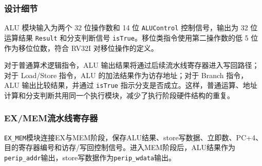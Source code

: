 \documentclass[12pt,a4paper]{ctexart}
\newcommand{\code}[1]{\texttt{#1}}
\begin{document}
\subsubsection*{设计细节}

ALU 模块输入为两个 32 位操作数和 14 位 \code{ALUControl} 控制信号，输出为 32 位运算结果 \code{Result} 和分支判断信号 \code{isTrue}。移位类指令使用第二操作数的低 5 位作为移位位数，符合 RV32I 对移位操作的定义。

对于普通算术逻辑指令，ALU 输出结果将通过后续流水线寄存器进入写回路径；对于 Load/Store 指令，ALU 的加法结果作为访存地址；对于 Branch 指令，ALU 输出比较结果，并通过 \code{isTrue} 指示分支是否成立。这样，普通运算、地址计算和分支判断共用同一个执行模块，减少了执行阶段硬件结构的重复。

\subsubsection{EX/MEM流水线寄存器}

\code{EX\_MEM}模块连接EX与MEM阶段，保存ALU结果、store写数据、立即数、PC+4、目的寄存器编号和访存/写回控制信号。进入MEM阶段后，ALU结果作为\code{perip\_addr}输出，store写数据作为\code{perip\_wdata}输出。
\end{document}
